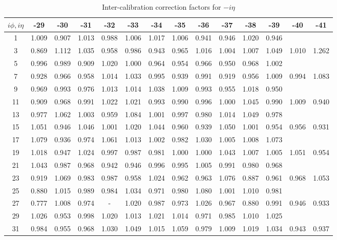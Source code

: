 \begin{table}[!hp]
\centering
\caption{Inter-calibration correction factors for $-i\eta$}
\label{tab:corrFacNegEta}
\begin{tabular}{c|ccccccccccccc}
\hline \hline
$i\phi,i\eta$ & -29 & -30 & -31 & -32 & -33 & -34 & -35 & -36 & -37 & -38 & -39 & -40 & -41 \\
\hline 
1 & 1.009 & 0.907 & 1.013 & 0.988 & 1.006 & 1.017 & 1.006 & 0.941 & 0.946 & 1.020 & 0.946 \\
3 & 0.869 & 1.112 & 1.035 & 0.958 & 0.986 & 0.943 & 0.965 & 1.016 & 1.004 & 1.007 & 1.049 & 1.010 & 1.262 \\
5 & 0.996 & 0.989 & 0.909 & 1.020 & 1.000 & 0.964 & 0.954 & 0.966 & 0.950 & 0.968 & 1.002 \\
7 & 0.928 & 0.966 & 0.958 & 1.014 & 1.033 & 0.995 & 0.939 & 0.991 & 0.919 & 0.956 & 1.009 & 0.994 & 1.083 \\
9 & 0.969 & 0.993 & 0.976 & 1.013 & 1.014 & 1.038 & 1.009 & 0.993 & 0.955 & 1.018 & 0.950 \\
11 & 0.909 & 0.968 & 0.991 & 1.022 & 1.021 & 0.993 & 0.990 & 0.996 & 1.000 & 1.045 & 0.990 & 1.009 & 0.940 \\
13 & 0.977 & 1.062 & 1.003 & 0.959 & 1.084 & 1.001 & 0.997 & 0.980 & 1.014 & 1.049 & 0.978 \\
15 & 1.051 & 0.946 & 1.046 & 1.001 & 1.020 & 1.044 & 0.960 & 0.939 & 1.050 & 1.001 & 0.954 & 0.956 & 0.931 \\
17 & 1.079 & 0.936 & 0.974 & 1.061 & 1.013 & 1.002 & 0.982 & 1.030 & 1.005 & 1.008 & 1.073 \\
19 & 1.018 & 0.947 & 1.024 & 0.997 & 0.987 & 0.981 & 1.000 & 1.000 & 1.043 & 1.007 & 1.005 & 1.051 & 0.954 \\
21 & 1.043 & 0.987 & 0.968 & 0.942 & 0.946 & 0.996 & 0.995 & 1.005 & 0.991 & 0.980 & 0.968 \\
23 & 0.919 & 1.069 & 0.983 & 0.987 & 0.958 & 1.024 & 0.962 & 0.963 & 1.076 & 0.887 & 0.961 & 0.968 & 1.053 \\
25 & 0.880 & 1.015 & 0.989 & 0.984 & 1.034 & 0.971 & 0.980 & 1.080 & 1.001 & 1.010 & 0.981 \\
27 & 0.777 & 1.008 & 0.974 & - & 1.020 & 0.987 & 0.973 & 1.026 & 0.967 & 0.880 & 0.991 & 0.946 & 0.933 \\
29 & 1.026 & 0.953 & 0.998 & 1.020 & 1.013 & 1.021 & 1.014 & 0.971 & 0.985 & 1.010 & 1.025 \\
31 & 0.984 & 0.955 & 0.968 & 1.030 & 1.049 & 1.015 & 1.059 & 0.979 & 1.009 & 1.019 & 1.034 & 0.943 & 0.937 \\

\end{tabular}
\end{table}

